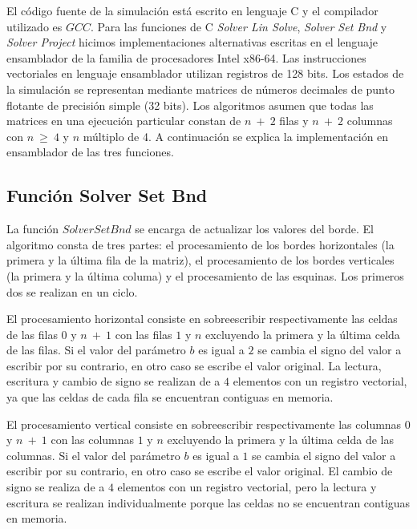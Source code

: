 El código fuente de la simulación está escrito en lenguaje C y el compilador utilizado es $GCC$. Para las funciones de C \textit{Solver Lin Solve}, \textit{Solver Set Bnd} y \textit{Solver Project} hicimos implementaciones alternativas escritas en el lenguaje ensamblador de la familia de procesadores Intel x86-64. Las instrucciones vectoriales en lenguaje ensamblador utilizan registros de 128 bits. Los estados de la simulación se representan mediante matrices de números decimales de punto flotante de precisión simple (32 bits). Los algoritmos asumen que todas las matrices en una ejecución particular constan de $n\ +\ 2$ filas y $n\ +\ 2$ columnas con $n\ \geq\ 4$ y $n$ múltiplo de 4. A continuación se explica la implementación en ensamblador de las tres funciones.

\subsection{Función Solver Set Bnd}
\par La función $Solver Set Bnd$ se encarga de actualizar los valores del borde. El algoritmo consta de tres partes: el procesamiento de los bordes horizontales (la primera y la última fila de la matriz), el procesamiento de los bordes verticales (la primera y la última columa) y el procesamiento de las esquinas. Los primeros dos se realizan en un ciclo.\newline
\par El procesamiento horizontal consiste en sobreescribir respectivamente las celdas de las filas $0$ y $n\ +\ 1$ con las filas $1$ y $n$ excluyendo la primera y la última celda de las filas. Si el valor del parámetro $b$ es igual a $2$ se cambia el signo del valor a escribir por su contrario, en otro caso se escribe el valor original. La lectura, escritura y cambio de signo se realizan de a $4$ elementos con un registro vectorial, ya que las celdas de cada fila se encuentran contiguas en memoria.\newline
\par El procesamiento vertical consiste en sobreescribir respectivamente las columnas $0$ y $n\ +\ 1$ con las columnas $1$ y $n$ excluyendo la primera y la última celda de las columnas. Si el valor del parámetro $b$ es igual a $1$ se cambia el signo del valor a escribir por su contrario, en otro caso se escribe el valor original. El cambio de signo se realiza de a $4$ elementos con un registro vectorial, pero la lectura y escritura se realizan individualmente porque las celdas no se encuentran contiguas en memoria.\newline
